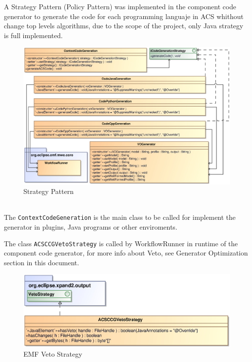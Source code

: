A Strategy Pattern (Policy Pattern) was implemented in the component code
generator to generate the code for each programming languaje in ACS whithout
change top levels algorithms, due to the scope of the project, only Java
strategy is full implemented. 
\begin{figure}[h!t]
\begin{center}
\includegraphics[scale=0.85]{images/strategypattern}
\caption{\label{fig:sp_diag}Strategy Pattern}
\end{center}
\end{figure}
\\The {\tt ContextCodeGeneration} is the main class to be called for implement
the generator in plugins, Java programs or other enviroments.

\newpage

The class {\tt ACSCCGVetoStrategy} is called by WorkflowRunner in runtime of
the component code generator, for more info about Veto, see Generator
Optimization section in this document. 
\begin{figure}[h!t]
\begin{center}
\includegraphics[scale=0.65]{images/vetostrategy}
\caption{\label{fig:vs_diag}EMF Veto Strategy}
\end{center}
\end{figure}


